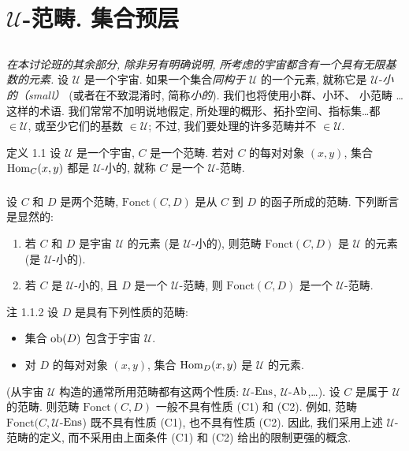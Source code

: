 \section{$𝒰$-范畴. 集合预层}

\setcounter{subsection}{-1}
\subsection{}
\emph{在本讨论班的其余部分, 除非另有明确说明,
所考虑的宇宙都含有一个具有无限基数的元素.}
设 $𝒰$ 是一个宇宙. 如果一个集合\emph{同构于} $𝒰$ 的一个元素,
就称它是 $𝒰$-\emph{小的（small）}
(或者在不致混淆时, 简称\emph{小的}). 我们也将使用小群、小环、
小范畴
\ldots 这样的术语. 我们常常不加明说地假定,
所处理的概形、拓扑空间、指标集\ldots 都 $\in 𝒰$,
或\pageoriginale{}至少它们的基数 $\in 𝒰$;
不过, 我们要处理的许多范畴并不 $\in 𝒰$.

\begin{enonce*}{定义 1.1}
设 $𝒰$ 是一个宇宙, $C$ 是一个范畴.
若对 $C$ 的每对对象 $(x,y)$, 集合 $\operatorname{Hom}_C(x,y)$ 都是 $𝒰$-小的,
就称 $C$ 是一个 $𝒰$-范畴.
\end{enonce*}

\setcounter{subsection}{1}
\subsubsection{}
设 $C$ 和 $D$ 是两个范畴, $\text{Fonct}(C,D)$ 是从 $C$ 到 $D$ 的函子所成的范畴.
下列断言是显然的:
\begin{enumerate}
\item[a)] 若 $C$ 和 $D$ 是宇宙 $𝒰$ 的元素
(\resp 是 $𝒰$-小的), 则范畴 $\text{Fonct}(C,D)$ 是
$𝒰$ 的元素 (\resp 是 $𝒰$-小的).

\item[b)] 若 $C$ 是 $𝒰$-小的, 且 $D$ 是一个 $𝒰$-范畴,
则 $\text{Fonct}(C,D)$ 是一个 $𝒰$-范畴.
\end{enumerate}

\begin{enonce*}[remark]{注 1.1.2}
设 $D$ 是具有下列性质的范畴:
\begin{itemize}
\item[(C1)] 集合 $\operatorname{ob}(D)$ 包含于宇宙 $𝒰$.

\item[(C2)] 对 $D$ 的每对对象 $(x,y)$,
集合 $\operatorname{Hom}_D(x,y)$ 是 $𝒰$ 的元素.
\end{itemize}
(从宇宙 $𝒰$ 构造的通常所用范畴都有这两个性质:
$𝒰$-$\operatorname{Ens}$,
$𝒰$-$\operatorname{Ab}$,\ldots). 设 $C$ 是属于 $𝒰$ 的范畴.
则范畴 $\text{Fonct}(C,D)$ 一般不具有性质 (C1) 和 (C2).
例如, 范畴 $\text{Fonct}(C,𝒰$-$\operatorname{Ens}$) 既不具有性质
(C1), 也不具有性质 (C2). 因此, 我们采用上述 $𝒰$-范畴的定义,
而不采用由上面条件 (C1) 和 (C2) 给出的限制更强的概念.
\end{enonce*}

